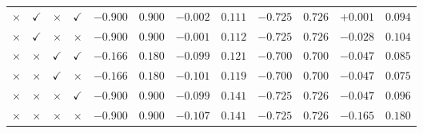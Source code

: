 \begin{table}[htbp]
\begin{tabular}{cccc  rr  rr  rr  rr}
$\times$ & $\checkmark$ & $\times$ & $\checkmark$ & $-0.900$ & $0.900$ & $-0.002$ & $0.111$ & $-0.725$ & $0.726$ & $+0.001$ & $0.094$ \\
$\times$ & $\checkmark$ & $\times$ & $\times$ & $-0.900$ & $0.900$ & $-0.001$ & $0.112$ & $-0.725$ & $0.726$ & $-0.028$ & $0.104$ \\
$\times$ & $\times$ & $\checkmark$ & $\checkmark$ & $-0.166$ & $0.180$ & $-0.099$ & $0.121$ & $-0.700$ & $0.700$ & $-0.047$ & $0.085$ \\
$\times$ & $\times$ & $\checkmark$ & $\times$ & $-0.166$ & $0.180$ & $-0.101$ & $0.119$ & $-0.700$ & $0.700$ & $-0.047$ & $0.075$ \\
$\times$ & $\times$ & $\times$ & $\checkmark$ & $-0.900$ & $0.900$ & $-0.099$ & $0.141$ & $-0.725$ & $0.726$ & $-0.047$ & $0.096$ \\
$\times$ & $\times$ & $\times$ & $\times$ & $-0.900$ & $0.900$ & $-0.107$ & $0.141$ & $-0.725$ & $0.726$ & $-0.165$ & $0.180$ \\
\bottomrule
\end{tabular}
\end{table}
